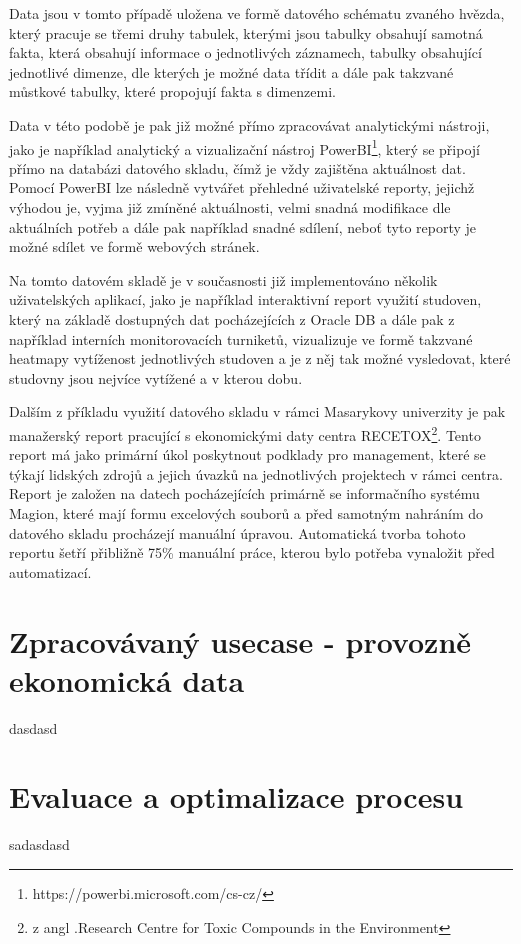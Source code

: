 \documentclass[
  digital,     %
  twoside,     %
  lof,         %
  lot,         %
]{fithesis4}
\begin{document}
Data jsou v tomto případě uložena ve formě datového schématu zvaného hvězda, který pracuje se třemi druhy tabulek, kterými jsou tabulky obsahují samotná fakta, která obsahují informace o jednotlivých záznamech, tabulky obsahující jednotlivé dimenze, dle kterých je možné data třídit a dále pak takzvané můstkové tabulky, které propojují fakta s dimenzemi. 

Data v této podobě je pak již možné přímo zpracovávat analytickými nástroji, jako je například analytický a vizualizační nástroj PowerBI\footnote{https://powerbi.microsoft.com/cs-cz/}, který se připojí přímo na databázi datového skladu, čímž je vždy zajištěna aktuálnost dat. Pomocí PowerBI lze následně vytvářet přehledné uživatelské reporty, jejichž výhodou je, vyjma již zmíněné aktuálnosti,  velmi snadná modifikace dle aktuálních potřeb a dále pak například snadné sdílení, neboť tyto reporty je možné sdílet ve formě webových stránek. 

Na tomto datovém skladě je v současnosti již implementováno několik uživatelských aplikací, jako je například interaktivní report využití studoven, který na základě dostupných dat pocházejících z Oracle DB a dále pak z například interních monitorovacích turniketů, vizualizuje ve formě takzvané heatmapy vytíženost jednotlivých studoven  a je z něj tak možné vysledovat, které studovny jsou nejvíce vytížené a v kterou dobu. 

Dalším z příkladu využití datového skladu v rámci Masarykovy univerzity je pak manažerský report pracující s ekonomickými daty centra RECETOX\footnote{z angl .Research Centre for Toxic Compounds in the Environment}. Tento report má jako primární úkol poskytnout podklady pro management, které se týkají lidských zdrojů a jejich úvazků na jednotlivých projektech v rámci centra. Report je  založen na datech pocházejících primárně se informačního systému Magion, které mají formu excelových souborů a před samotným nahráním do datového skladu procházejí manuální úpravou. Automatická tvorba tohoto reportu šetří přibližně 75\% manuální práce, kterou bylo potřeba vynaložit před automatizací.


\section{Zpracovávaný usecase - provozně ekonomická data}
dasdasd

\section{Evaluace a optimalizace procesu}
sadasdasd
\end{document}
